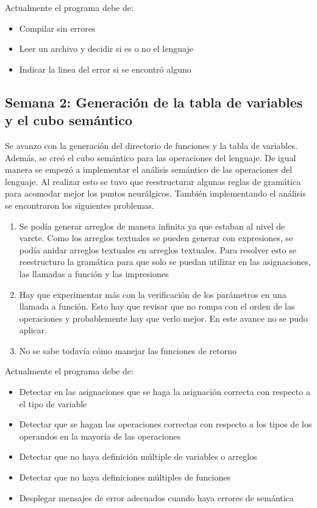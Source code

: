 Actualmente el programa debe de:
\begin{itemize}
    \item Compilar sin errores
    \item Leer un archivo y decidir si es o no el lenguaje
    \item Indicar la linea del error si se encontró alguno
\end{itemize}

\subsection{Semana 2: Generación de la tabla de variables y el cubo semántico}
Se avanzo con la generación del directorio de funciones y la tabla de variables. Además, se creó el cubo semántico para las operaciones del lenguaje. De igual manera se empezó a implementar el análisis semántico de las operaciones del lenguaje. Al realizar esto se tuvo que reestructurar algunas reglas de gramática para acomodar mejor los puntos neurálgicos. También implementando el análisis se encontraron los siguientes problemas.
\begin{enumerate}
    \item Se podía generar arreglos de manera infinita ya que estaban al nivel de varcte. Como los arreglos textuales se pueden generar con expresiones, se podía anidar arreglos textuales en arreglos textuales. Para resolver esto se reestructuro la gramática para que solo se puedan utilizar en las asignaciones, las llamadas a función y las impresiones
    \item Hay que experimentar más con la verificación de los parámetros en una llamada a función. Esto hay que revisar que no rompa con el orden de las operaciones y probablemente hay que verlo mejor. En este avance no se pudo aplicar.
    \item No se sabe todavía cómo manejar las funciones de retorno
\end{enumerate}

Actualmente el programa debe de:
\begin{itemize}
    \item Detectar en las asignaciones que se haga la asignación correcta con respecto a el tipo de variable
    \item Detectar que se hagan las operaciones correctas con respecto a los tipos de los operandos en la mayoría de las operaciones
    \item Detectar que no haya definición múltiple de variables o arreglos
    \item Detectar que no haya definiciones múltiples de funciones
    \item Desplegar mensajes de error adecuados cuando haya errores de semántica
\end{itemize}



